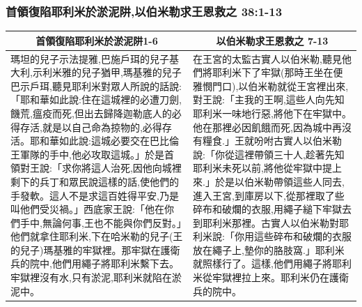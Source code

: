 \subsubsection{首領復陷耶利米於淤泥阱,以伯米勒求王恩救之 38:1-13}
\begin{table}[H]
\centering
\begin{tabular}{p{9cm}|p{8.25cm}}\hline\hline
\multicolumn{1}{c|}{首領復陷耶利米於淤泥阱1-6}&\multicolumn{1}{c}{以伯米勒求王恩救之 7-13}\\\hline
瑪坦的兒子示法提雅,巴施戶珥的兒子基大利,示利米雅的兒子猶甲,瑪基雅的兒子巴示戶珥,聽見耶利米對眾人所說的話說:「耶和華如此說:住在這城裡的必遭刀劍,饑荒,瘟疫而死,但出去歸降迦勒底人的必得存活,就是以自己命為掠物的,必得存活。耶和華如此說:這城必要交在巴比倫王軍隊的手中,他必攻取這城。」於是首領對王說:「求你將這人治死,因他向城裡剩下的兵丁和眾民說這樣的話,使他們的手發軟。這人不是求這百姓得平安,乃是叫他們受災禍。」西底家王說:「他在你們手中,無論何事,王也不能與你們反對。」他們就拿住耶利米,下在哈米勒的兒子(王的兒子)瑪基雅的牢獄裡。那牢獄在護衛兵的院中,他們用繩子將耶利米繫下去。牢獄裡沒有水,只有淤泥,耶利米就陷在淤泥中。
&在王宮的太監古實人以伯米勒,聽見他們將耶利米下了牢獄(那時王坐在便雅憫門口),以伯米勒就從王宮裡出來,對王說:「主我的王啊,這些人向先知耶利米一味地行惡,將他下在牢獄中。他在那裡必因飢餓而死,因為城中再沒有糧食.」王就吩咐古實人以伯米勒說:「你從這裡帶領三十人,趁著先知耶利米未死以前,將他從牢獄中提上來.」於是以伯米勒帶領這些人同去,進入王宮,到庫房以下,從那裡取了些碎布和破爛的衣服,用繩子縋下牢獄去到耶利米那裡。古實人以伯米勒對耶利米說:「你用這些碎布和破爛的衣服放在繩子上,墊你的胳肢窩.」耶利米就照樣行了。這樣,他們用繩子將耶利米從牢獄裡拉上來。耶利米仍在護衛兵的院中。\\\hline
\end{tabular}
\end{table}

